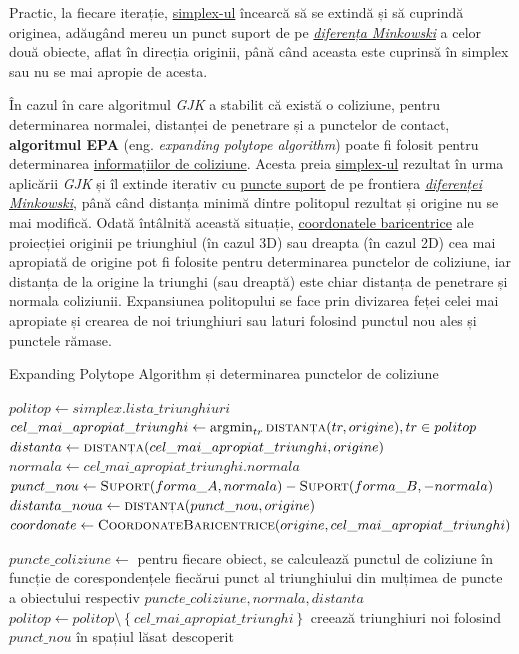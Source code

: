 \documentclass[12pt,a4paper]{report}
\DeclareMathOperator*{\argmin}{\arg\!\min}
\begin{document}
Practic, la fiecare iterație, \hyperref[simplex]{simplex-ul} încearcă să se extindă și să cuprindă originea, adăugând mereu un punct suport de pe \hyperref[minkowski_difference]{\textit{diferența Minkowski}} a celor două obiecte, aflat în direcția originii, până când aceasta este cuprinsă în simplex sau nu se mai apropie de acesta.



În cazul în care algoritmul \textit{GJK} a stabilit că există o coliziune, pentru determinarea normalei, distanței de penetrare și a punctelor de contact, \textbf{algoritmul EPA}\cite{epa_gino} (eng. \textit{expanding polytope algorithm}) poate fi folosit pentru determinarea \hyperref[punct_coliziune]{informațiilor de coliziune}. Acesta preia \hyperref[simplex]{simplex-ul} rezultat în urma aplicării \textit{GJK} și îl extinde iterativ cu \hyperref[support_points]{puncte suport} de pe frontiera \hyperref[minkowski_difference]{\textit{diferenței Minkowski}}, până când distanța minimă dintre politopul rezultat și origine nu se mai modifică. Odată întâlnită această situație, \hyperref[barycenric_coordinates]{coordonatele baricentrice} ale proiecției originii pe triunghiul (în cazul 3D) sau dreapta (în cazul 2D) cea mai apropiată de origine pot fi folosite pentru determinarea punctelor de coliziune, iar distanța de la origine la triunghi (sau dreaptă) este chiar distanța de penetrare și normala coliziunii. Expansiunea politopului se face prin divizarea feței celei mai apropiate și crearea de noi triunghiuri sau laturi folosind punctul nou ales și punctele rămase.

\begin{algorithm}[]
	\footnotesize
	\linespread{0.9}\selectfont
	\caption{Expanding Polytope Algorithm și determinarea punctelor de coliziune}
	\label{epa}
	\begin{algorithmic}[0]
			\State $ politop \gets simplex.lista\_triunghiuri $
			\Loop
				\State $ cel\_mai\_apropiat\_triunghi \gets \argmin_{tr} \textproc{distanța}(tr, origine), tr \in politop $
				\State $ distanta \gets \textproc{distanța}(cel\_mai\_apropiat\_triunghi, origine) $
				\State $ normala \gets cel\_mai\_apropiat\_triunghi.normala $
				\State $ punct\_nou \gets \textproc{Suport}(forma\_A, normala) - \textproc{Suport}(forma\_B, -normala) $
				\State $ distanta\_noua \gets \textproc{distanța}(punct\_nou, origine) $
					\State $ coordonate \gets \textproc{CoordonateBaricentrice}(origine, cel\_mai\_apropiat\_triunghi) $
					
				\State	$ puncte\_coliziune \gets $ pentru fiecare obiect, se calculează punctul de coliziune în funcție de corespondențele fiecărui punct al triunghiului din mulțimea de puncte a obiectului respectiv
				\State \Return $ puncte\_coliziune, normala, distanta $
				\EndIf
				\State $ politop \gets politop \setminus \left\lbrace cel\_mai\_apropiat\_triunghi \right\rbrace $
				\State creează triunghiuri noi folosind $ punct\_nou $ în spațiul lăsat descoperit
			\EndLoop
		\EndFunction
	\end{algorithmic}
\end{algorithm}
\end{document}
